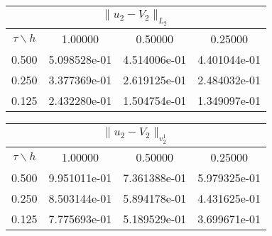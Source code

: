 \begin{center}
\begin{tabular}{||c|c|c|c||}
\hline
\hline
\multicolumn{4}{||c||}{$\|u_2-V_2\| _{L_2}$}\\ 
\hline
\hline
$\tau \backslash h$ & 1.00000 & 0.50000 & 0.25000\\ 
\hline 
0.500& 5.098528e-01 &4.514006e-01 &4.401044e-01 \\ 
\hline
0.250& 3.377369e-01 &2.619125e-01 &2.484032e-01 \\ 
\hline
0.125& 2.432280e-01 &1.504754e-01 &1.349097e-01 \\ 
\hline
\hline
\end{tabular}
\end{center}
\begin{center}
\begin{tabular}{||c|c|c|c||}
\hline
\hline
\multicolumn{4}{||c||}{$\|u_2-V_2\| _{v_2^1}$}\\ 
\hline
\hline
$\tau \backslash h$ & 1.00000 & 0.50000 & 0.25000\\ 
\hline 
0.500& 9.951011e-01 &7.361388e-01 &5.979325e-01 \\ 
\hline
0.250& 8.503144e-01 &5.894178e-01 &4.431625e-01 \\ 
\hline
0.125& 7.775693e-01 &5.189529e-01 &3.699671e-01 \\ 
\hline
\hline
\end{tabular}
\end{center}
